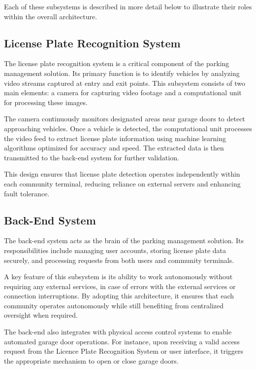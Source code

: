 Each of these subsystems is described in more detail below to illustrate their roles within the overall architecture.

\subsection{License Plate Recognition System}

The license plate recognition system is a critical component of the parking management solution. Its primary function is to identify vehicles by analyzing video streams captured at entry and exit points. This subsystem consists of two main elements: a camera for capturing video footage and a computational unit for processing these images.

The camera continuously monitors designated areas near garage doors to detect approaching vehicles. Once a vehicle is detected, the computational unit processes the video feed to extract license plate information using machine learning algorithms optimized for accuracy and speed. The extracted data is then transmitted to the back-end system for further validation.

This design ensures that license plate detection operates independently within each community terminal, reducing reliance on external servers and enhancing fault tolerance.

\subsection{Back-End System}

The back-end system acts as the brain of the parking management solution. Its responsibilities include managing user accounts, storing license plate data securely, and processing requests from both users and community terminals.

A key feature of this subsystem is its ability to work autonomously without requiring any external services, in case of errors with the external services or connection interruptions. By adopting this architecture, it ensures that each community operates autonomously while still benefiting from centralized oversight when required.

The back-end also integrates with physical access control systems to enable automated garage door operations. For instance, upon receiving a valid access request from the Licence Plate Recognition System or user interface, it triggers the appropriate mechanism to open or close garage doors.

